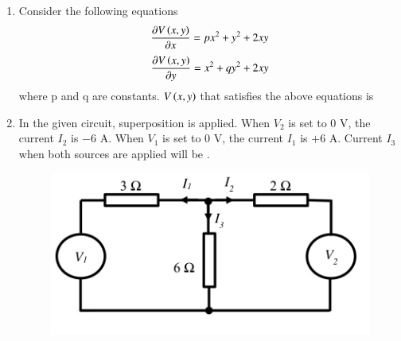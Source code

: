 \documentclass[journal,12pt,onecolumn]{IEEEtran}
\theoremstyle{remark}
\begin{document}
\begin{enumerate}
    \hfill{}
    \begin{enumerate}
    \end{enumerate}

    \item Consider the following equations
    $$ \frac{\partial V\left(x,y\right)}{\partial x}=px^{2}+y^{2}+2xy $$
    $$ \frac{\partial V\left(x,y\right)}{\partial y}=x^{2}+qy^{2}+2xy $$
    where p and q are constants. $V\left(x,y\right)$ that satisfies the above equations is
    
    \hfill{}
    \begin{enumerate}
    \end{enumerate}
    
    \item In the given circuit, superposition is applied. When $V_{2}$ is set to $0$ V, the current $I_{2}$ is $-6$ A. When $V_{1}$ is set to $0$ V, the current $I_{1}$ is $+6$ A. Current $I_3$  when both sources are applied will be  \underline{\hspace{2cm}}.
    \begin{figure}[H]
        \centering
        \includegraphics[width=0.6\columnwidth]{q30.png}
        \caption*{}
        \label{fig:q30}
    \end{figure}
    

\end{enumerate}
\end{document}
